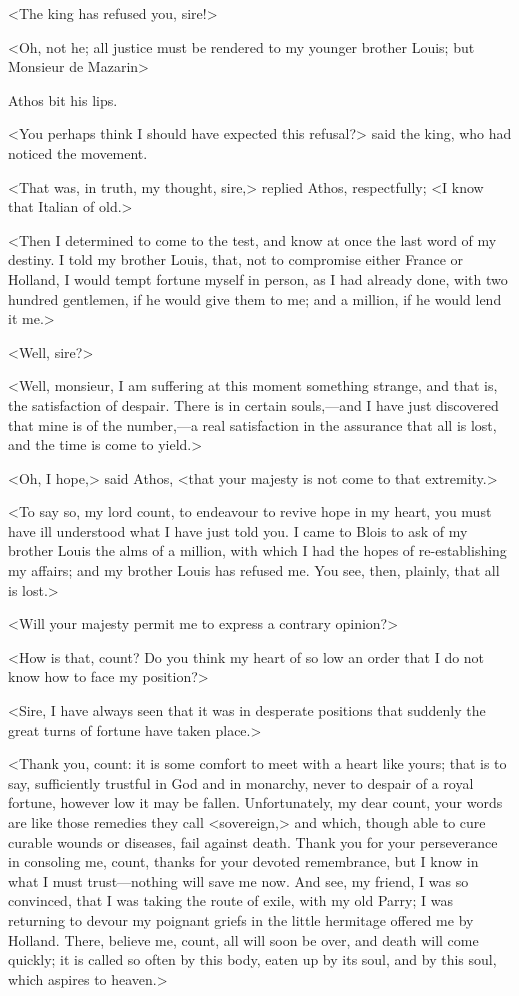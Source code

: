 <The king has refused you, sire!>

<Oh, not he; all justice must be rendered to my younger brother Louis; but Monsieur de Mazarin\longdash>

Athos bit his lips.

<You perhaps think I should have expected this refusal?> said the king, who had noticed the movement.

<That was, in truth, my thought, sire,> replied Athos, respectfully; <I know that Italian of old.>

<Then I determined to come to the test, and know at once the last word of my destiny. I told my brother Louis, that, not to compromise either France or Holland, I would tempt fortune myself in person, as I had already done, with two hundred gentlemen, if he would give them to me; and a million, if he would lend it me.>

<Well, sire?>

<Well, monsieur, I am suffering at this moment something strange, and that is, the satisfaction of despair. There is in certain souls,—and I have just discovered that mine is of the number,—a real satisfaction in the assurance that all is lost, and the time is come to yield.>

<Oh, I hope,> said Athos, <that your majesty is not come to that extremity.>

<To say so, my lord count, to endeavour to revive hope in my heart, you must have ill understood what I have just told you. I came to Blois to ask of my brother Louis the alms of a million, with which I had the hopes of re-establishing my affairs; and my brother Louis has refused me. You see, then, plainly, that all is lost.>

<Will your majesty permit me to express a contrary opinion?>

<How is that, count? Do you think my heart of so low an order that I do not know how to face my position?>

<Sire, I have always seen that it was in desperate positions that suddenly the great turns of fortune have taken place.>

<Thank you, count: it is some comfort to meet with a heart like yours; that is to say, sufficiently trustful in God and in monarchy, never to despair of a royal fortune, however low it may be fallen. Unfortunately, my dear count, your words are like those remedies they call <sovereign,> and which, though able to cure curable wounds or diseases, fail against death. Thank you for your perseverance in consoling me, count, thanks for your devoted remembrance, but I know in what I must trust—nothing will save me now. And see, my friend, I was so convinced, that I was taking the route of exile, with my old Parry; I was returning to devour my poignant griefs in the little hermitage offered me by Holland. There, believe me, count, all will soon be over, and death will come quickly; it is called so often by this body, eaten up by its soul, and by this soul, which aspires to heaven.>

